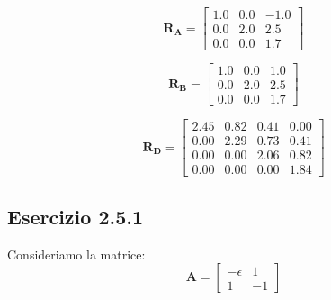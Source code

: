 \documentclass[letterpaper, 12pt]{article}
\numberwithin{equation}{section}    %
\begin{document}
\begin{center}
    \begin{minipage}{0.32\textwidth}
    \centering
    \[
    \mathbf{R_A} =
    \begin{bmatrix}
        1.0  &  0.0  &  -1.0 \\
        0.0  &  2.0  &  2.5 \\
        0.0  &  0.0  &  1.7
    \end{bmatrix}
    \]
    \end{minipage}
    \hfill
    \begin{minipage}{0.32\textwidth}
    \centering
    \[
    \mathbf{R_B} =
    \begin{bmatrix}
    1.0  &  0.0  &  1.0 \\
    0.0  &  2.0  &  2.5 \\
    0.0  &  0.0  &  1.7
    \end{bmatrix}
    \]
    \end{minipage}
    \hfill
    \begin{minipage}{0.32\textwidth}
    \centering
    \[
    \mathbf{R_D} =
    \begin{bmatrix}
    2.45 & 0.82 & 0.41 & 0.00 \\
    0.00 & 2.29 & 0.73 & 0.41 \\
    0.00 & 0.00 & 2.06 & 0.82 \\
    0.00 & 0.00 & 0.00 & 1.84
    \end{bmatrix}
    \]
    \end{minipage}
\end{center}

\subsection{Esercizio 2.5.1}
Consideriamo la matrice:
\[
\mathbf{A} =
\begin{bmatrix}
-\epsilon &  1 \\
        1 & -1
\end{bmatrix}
\]
\end{document}
